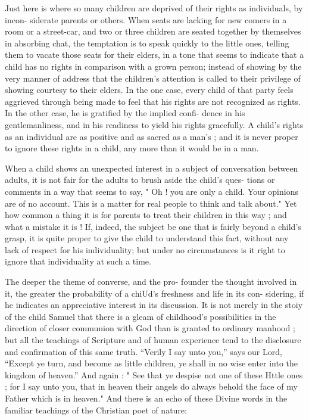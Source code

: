 \documentclass[
]{book}
\begin{document}
Just here is where so many children are deprived of their rights as individuals, by incon- siderate parents or others. When seats are lacking for new comers in a room or a street-car, and two or three children are seated together by themselves in absorbing chat, the temptation is to speak quickly to the little ones, telling them to vacate those seats for their elders, in a tone that seems to indicate that a child has no rights in comparison with a grown person; instead of showing by the very manner of address that the children's attention is called to their privilege of showing courtesy to their elders. In the one case, every child of that party feels aggrieved through being made to feel that his rights are not recognized as rights. In the other case, he is gratified by the implied confi- dence in his gentlemanliness, and in his readiness to yield his rights gracefully. A child's rights as an individual are as positive and as sacred as a man's ; and it is never proper to ignore these rights in a child, any more than it would be in a man.

When a child shows an unexpected interest in a subject of conversation between adults, it is not fair for the adults to brush aside the child's ques- tions or comments in a way that seems to say, " Oh ! you are only a child. Your opinions are of no account. This is a matter for real people to think and talk about." Yet how common a thing it is for parents to treat their children in this way ; and what a mistake it is ! If, indeed, the subject be one that is fairly beyond a child's grasp, it is quite proper to give the child to understand this fact, without any lack of respect for his individuality; but under no circumstances is it right to ignore that individuality at such a time.

The deeper the theme of converse, and the pro- founder the thought involved in it, the greater the probability of a chiUd's freshness and life in its con- sidering, if he indicates an appreciative interest in its discussion. It is not merely in the stoiy of the child Samuel that there is a gleam of childhood's possibilities in the direction of closer communion with God than is granted to ordinary manhood ; but all the teachings of Scripture and of human experience tend to the disclosure and confirmation of this same truth. ``Verily I say unto you,'' says our Lord, ``Except ye turn, and become as little children, ye shall in no wise enter into the kingdom of heaven.'' And again : " See that ye despise not one of these Httle ones ; for I say unto you, that in heaven their angels do always behold the face of my Father which is in heaven." And there is an echo of these Divine words in the familiar teachings of the Christian poet of nature:
\end{document}
